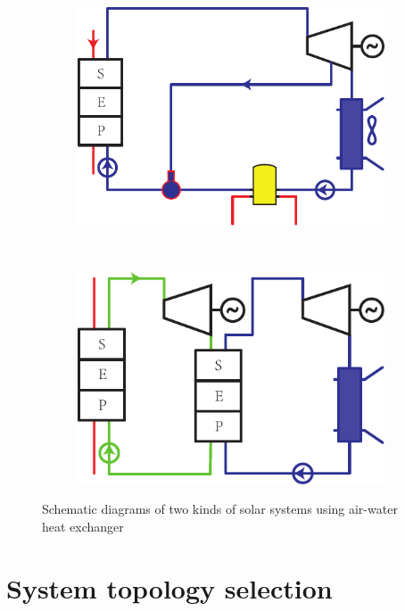 \noindent \begin{figure}[htbp]
\centering
	\begin{subfigure}[b]{0.4\columnwidth}
	\includegraphics[width = \columnwidth]{fig/Stirling-Rankine}
	\caption{}\label{fig:air-water1}
	\end{subfigure}
	~
\begin{subfigure}[b]{0.4\columnwidth}
	\includegraphics[width = \columnwidth]{fig/SeriesRankine}
	\caption{}\label{fig:air-water2}
	\end{subfigure}
	\caption{Schematic diagrams of two kinds of solar systems using air-water heat exchanger}
	\label{fig:coupledCycles}
\end{figure}

\section{System topology selection}
